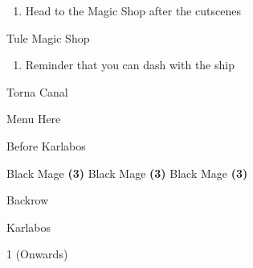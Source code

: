 \begin{paracol}{2}
\switchcolumnTwice[*]
\resume
\begin{enumerate}[resume]
    \item Head to the Magic Shop after the cutscenes
\end{enumerate}

\begin{shop}{Tule Magic Shop}
    \varwb
    \begin{buy}
        \item {} \fire{}
        \item {} \bolt{}
        \item {} \cure{}
    \end{buy}
    \varwe
\end{shop}

\vspace{-0.20cm}
\begin{enumerate}[resume]
    \item Reminder that you can dash with the ship
\end{enumerate}

\switchcolumn
\vspace{-1.25cm}
\begin{steproute}{Torna Canal}
\end{steproute}

\begin{misc}{Menu Here}
\end{misc}

\switchcolumn
\begin{menu}{Before Karlabos}
	\varwb
    \begin{jobMenu}
		\galuf Black Mage \textbf{(3\pointLeft)}
        \lenna Black Mage \textbf{(3\pointLeft)}
        \bartz Black Mage \textbf{(3\pointLeft)}
	\end{jobMenu}
    \begin{rowMenu}
        \everyone Backrow
    \end{rowMenu}
    \varwe
\end{menu}

\begin{boss}{Karlabos}
	\varwb
	\begin{round}{1 (Onwards)}
		\everyone \leftCommand{\black} \then \bolt
    \end{round}
	\varwe
\end{boss}

\end{paracol}